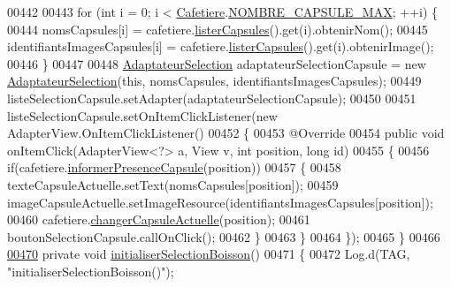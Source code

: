 \begin{DoxyCode}
00442 
00443         \textcolor{keywordflow}{for} (\textcolor{keywordtype}{int} i = 0; i < \hyperlink{classcom_1_1example_1_1ekawa_1_1_cafetiere}{Cafetiere}.\hyperlink{classcom_1_1example_1_1ekawa_1_1_cafetiere_a183d96e89c056c4ac9c565bf8f24851e}{NOMBRE\_CAPSULE\_MAX}; ++i) \{
00444             nomsCapsules[i] = cafetiere.\hyperlink{classcom_1_1example_1_1ekawa_1_1_cafetiere_a86149d999dc196c3d97c855be0073e99}{listerCapsules}().get(i).obtenirNom();
00445             identifiantsImagesCapsules[i] = cafetiere.\hyperlink{classcom_1_1example_1_1ekawa_1_1_cafetiere_a86149d999dc196c3d97c855be0073e99}{listerCapsules}().get(i).obtenirImage();
00446         \}
00447 
00448         \hyperlink{classcom_1_1example_1_1ekawa_1_1_ihm_1_1_adaptateur_selection}{AdaptateurSelection} adaptateurSelectionCapsule = \textcolor{keyword}{new} 
      \hyperlink{classcom_1_1example_1_1ekawa_1_1_ihm_1_1_adaptateur_selection_a41746ec1a290651b4cacb0894a32307b}{AdaptateurSelection}(\textcolor{keyword}{this}, nomsCapsules, identifiantsImagesCapsules);
00449         listeSelectionCapsule.setAdapter(adaptateurSelectionCapsule);
00450 
00451         listeSelectionCapsule.setOnItemClickListener(\textcolor{keyword}{new} AdapterView.OnItemClickListener()
00452         \{
00453             @Override
00454             \textcolor{keyword}{public} \textcolor{keywordtype}{void} onItemClick(AdapterView<?> a, View v, \textcolor{keywordtype}{int} position, \textcolor{keywordtype}{long} \textcolor{keywordtype}{id})
00455             \{
00456                 \textcolor{keywordflow}{if}(cafetiere.\hyperlink{classcom_1_1example_1_1ekawa_1_1_cafetiere_a35a291f849346b374f63324bc3ecd70b}{informerPresenceCapsule}(position))
00457                 \{
00458                     texteCapsuleActuelle.setText(nomsCapsules[position]);
00459                     imageCapsuleActuelle.setImageResource(identifiantsImagesCapsules[position]);
00460                     cafetiere.\hyperlink{classcom_1_1example_1_1ekawa_1_1_cafetiere_a686b4e821ea9164323753eb123576921}{changerCapsuleActuelle}(position);
00461                     boutonSelectionCapsule.callOnClick();
00462                 \}
00463             \}
00464         \});
00465     \}
00466 
\hyperlink{classcom_1_1example_1_1ekawa_1_1_ihm_a0a4086cea2ee9d6d18c957513706cbce}{00470}     \textcolor{keyword}{private} \textcolor{keywordtype}{void} \hyperlink{classcom_1_1example_1_1ekawa_1_1_ihm_a0a4086cea2ee9d6d18c957513706cbce}{initialiserSelectionBoisson}()
00471     \{
00472         Log.d(TAG, \textcolor{stringliteral}{"initialiserSelectionBoisson()"});

\end{DoxyCode}
